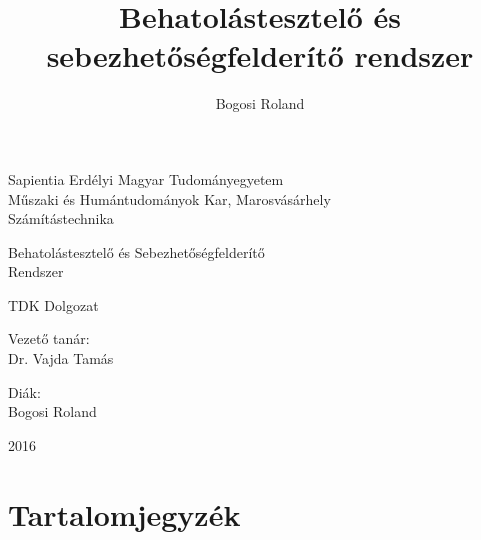 \documentclass[a4paper,12pt]{article}
\author{Bogosi Roland}
\title{Behatolástesztelő és sebezhetőségfelderítő rendszer}
\begin{document}
\pagestyle{empty}

	\begin{center}
		{\Large Sapientia Erdélyi Magyar Tudományegyetem}\\\vspace{0.05in}
		{\Large Műszaki és Humántudományok Kar, Marosvásárhely}\\\vspace{0.07in}
		{\Large Számítástechnika}\\
		
		\vspace{2.5in}
		
		{\huge Behatolástesztelő és Sebezhetőségfelderítő}\\\vspace{0.1in}
		{\huge Rendszer}
		
		\vspace{0.5in}
		
		{\LARGE TDK Dolgozat}
		
	\end{center}
	
	\vspace{2.0in}
	
	\begin{multicols}{2}
		\begin{flushleft}
			{\Large Vezető tanár:}\\\vspace{0.1in}
			{\LARGE {Dr. Vajda Tamás}}
		\end{flushleft}
		\columnbreak
		\begin{flushright}
			{\Large Diák:}\\\vspace{0.1in}
			{\LARGE {Bogosi Roland}}
		\end{flushright}
	\end{multicols}
	
	\vspace{1.5in}
		
	\begin{center}
		{\LARGE 2016}
	\end{center}

\newpage
\section*{Tartalomjegyzék}

	\begingroup
	\renewcommand{\section}[2]{}
	\hypersetup{linkcolor=lightblue}
	\setlength{\parskip}{0em}
	\tableofcontents
	\endgroup
\end{document}
